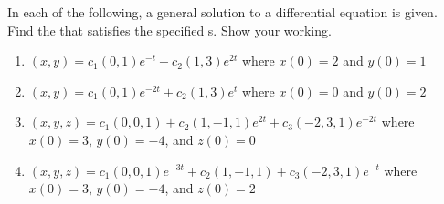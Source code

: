 \begin{exercise}  
In each of the following, a general solution to a differential equation is given.  
Find the  that satisfies the specified s.
Show your working.
\begin{enumerate}
\item \((x,y)=c_1(0,1)e^{-t}+c_2(1,3)e^{2t}\) where \(x(0)=2\) and \(y(0)=1\)

\item \((x,y)=c_1(0,1)e^{-2t}+c_2(1,3)e^{t}\) where \(x(0)=0\) and \(y(0)=2\)


\item \((x,y,z)=c_1(0,0,1) +c_2(1,-1,1)e^{2t} +c_3(-2,3,1)e^{-2t}\) where \(x(0)=3\), \(y(0)=-4\), and \(z(0)=0\)

\item \((x,y,z)=c_1(0,0,1)e^{-3t} +c_2(1,-1,1) +c_3(-2,3,1)e^{-t}\) where \(x(0)=3\), \(y(0)=-4\), and \(z(0)=2\)

\end{enumerate}
\end{exercise}







